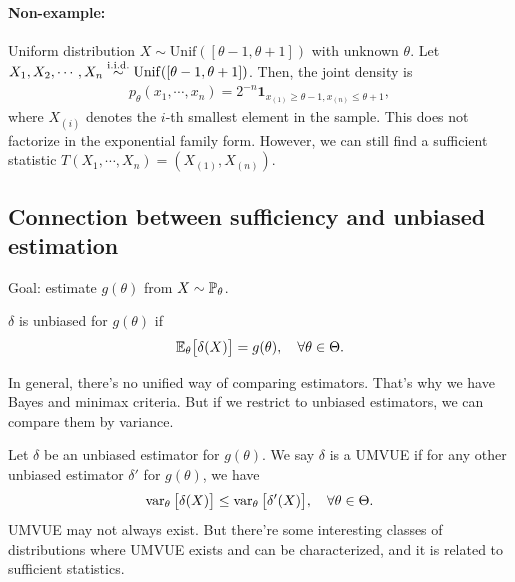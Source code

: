 \documentclass[11pt,letterpaper]{article}
\numberwithin{theorem}{lecture}
\numberwithin{proposition}{lecture}
\numberwithin{lemma}{lecture}
\numberwithin{claim}{lecture}
\numberwithin{corollary}{lecture}
\numberwithin{definition}{lecture}
\numberwithin{conjecture}{lecture}
\numberwithin{remark}{lecture}
\numberwithin{example}{lecture}
\numberwithin{equation}{lecture}
\begin{document}
\paragraph{Non-example:}\hfill\break
Uniform distribution $X \sim \mathrm{Unif} ([\theta - 1, \theta + 1])$ with unknown $\theta$. Let $X_1, X_2, \cdots, X_n \overset{\mathrm{i.i.d.}}{\sim} \mathrm{Unif} ([\theta - 1, \theta + 1])$. Then, the joint density is
\begin{align*}
 p_\theta (x_1, \cdots, x_n) = 2^{-n} \bm{1}_{x_{(1)} \geq \theta - 1, x_{(n)} \leq \theta + 1},
\end{align*}
where $X_{(i)}$ denotes the $i$-th smallest element in the sample. This does not factorize in the exponential family form. However, we can still find a sufficient statistic $T(X_1, \cdots, X_n) = (X_{(1)}, X_{(n)})$.

\subsection{Connection between sufficiency and unbiased estimation}
Goal: estimate $g (\theta)$ from $X \sim {\mathbb{P}}_\theta$.
\begin{definition}
  $\delta$ is unbiased for $g (\theta)$ if
  \begin{align*}
    {\mathbb{E}}_\theta \big[ \delta (X) \big] = g (\theta), \quad \forall \theta \in \Theta.
  \end{align*}
\end{definition}
In general, there's no unified way of comparing estimators. That's why we have Bayes and minimax criteria. But if we restrict to unbiased estimators, we can compare them by variance.
\begin{definition}
  Let $\delta$ be an unbiased estimator for $g (\theta)$. We say $\delta$ is a UMVUE if for any other unbiased estimator $\delta'$ for $g (\theta)$, we have
  \begin{align*}
    \operatorname{var}_\theta \big[ \delta (X) \big] \leq \operatorname{var}_\theta \big[ \delta' (X) \big], \quad \forall \theta \in \Theta.
  \end{align*}
  UMVUE may not always exist. But there're some interesting classes of distributions where UMVUE exists and can be characterized, and it is related to sufficient statistics.

\end{definition}
\end{document}
